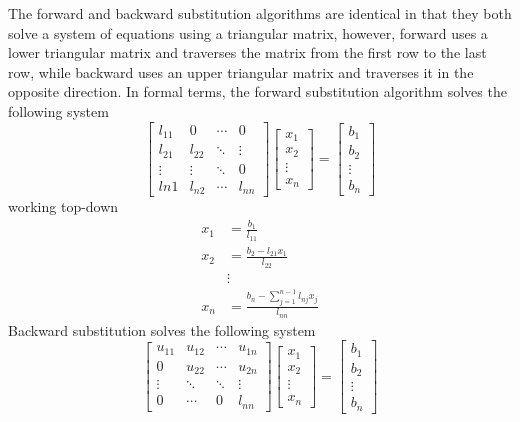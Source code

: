\documentclass[12pt, a4paper]{article}
\begin{document}
The forward and backward substitution algorithms are identical in that they both
solve a system of equations using a triangular matrix, however, forward uses a
lower triangular matrix and traverses the matrix from the first row to the last
row, while backward uses an upper triangular matrix and traverses it in the
opposite direction. In formal terms, the forward substitution algorithm solves
the following system
\begin{equation*}
  \begin{bmatrix}
    l_{11} & 0 & \dotsi & 0 \\
    l_{21} & l_{22} & \ddots & \vdots \\
    \vdots & \vdots & \ddots & 0 \\
    l{n1} & l_{n2} & \dotsi & l_{nn}
  \end{bmatrix}
  \begin{bmatrix}
    x_1 \\
    x_2 \\
    \vdots \\
    x_n
  \end{bmatrix}
  =
  \begin{bmatrix}
    b_1 \\
    b_2 \\
    \vdots \\
    b_n
  \end{bmatrix}
\end{equation*}
working top-down
\begin{align*}
x_1 &= \frac{b_1}{l_{11}} \\
x_2 &= \frac{b_2 - l_{21}x_1}{l_{22}} \\
    &\vdots \\
x_n &= \frac{b_n - \sum^{n - 1}_{j = 1} l_{nj}x_j}{l_{nn}}
\end{align*}
Backward substitution solves the following system
\begin{equation*}
  \begin{bmatrix}
    u_{11} & u_{12} & \dotsi & u_{1n} \\
    0 & u_{22} & \dotsi & u_{2n} \\
    \vdots & \ddots & \ddots & \vdots \\
    0 & \dotsi & 0 & l_{nn}
  \end{bmatrix}
  \begin{bmatrix}
    x_1 \\
    x_2 \\
    \vdots \\
    x_n
  \end{bmatrix}
  =
  \begin{bmatrix}
    b_1 \\
    b_2 \\
    \vdots \\
    b_n
  \end{bmatrix}
\end{equation*}
\end{document}
